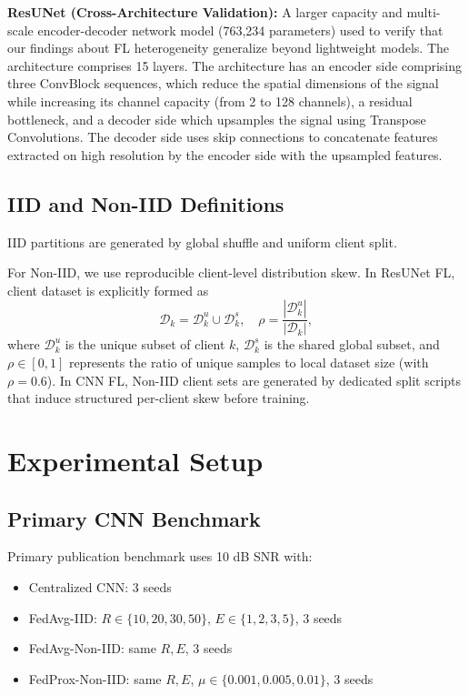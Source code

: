 \documentclass[runningheads]{llncs}
\begin{document}
\textbf{ResUNet (Cross-Architecture Validation):} A larger capacity and multi-scale encoder-decoder network model (763,234 parameters) used to verify that our findings about
FL heterogeneity generalize beyond lightweight models. The architecture comprises 15 layers. The architecture has an encoder side comprising three ConvBlock sequences, which reduce the spatial dimensions of the signal while increasing its channel capacity (from 2 to 128 channels), a residual bottleneck, and a decoder side which upsamples the signal using Transpose Convolutions. The decoder side uses skip connections to concatenate features extracted on high resolution by the encoder side with the upsampled features.

\subsection{IID and Non-IID Definitions}
IID partitions are generated by global shuffle and uniform client split.

For Non-IID, we use reproducible client-level distribution skew. In ResUNet FL, client dataset is explicitly formed as
\begin{equation}
\mathcal{D}_k=\mathcal{D}_k^u \cup \mathcal{D}_k^s,\quad \rho=\frac{|\mathcal{D}_k^u|}{|\mathcal{D}_k|},
\end{equation}
where $\mathcal{D}_k^u$ is the unique subset of client $k$, $\mathcal{D}_k^s$ is the shared global subset, and $\rho \in [0, 1]$ represents the ratio of unique samples to local dataset size (with $\rho=0.6$). In CNN FL, Non-IID client sets are generated by dedicated split scripts that induce structured per-client skew before training.


\section{Experimental Setup}
\subsection{Primary CNN Benchmark}
Primary publication benchmark uses 10 dB SNR with:
\begin{itemize}
    \item Centralized CNN: 3 seeds
    \item FedAvg-IID: $R\in\{10,20,30,50\}$, $E\in\{1,2,3,5\}$, 3 seeds
    \item FedAvg-Non-IID: same $R,E$, 3 seeds
    \item FedProx-Non-IID: same $R,E$, $\mu\in\{0.001,0.005,0.01\}$, 3 seeds
\end{itemize}
\end{document}
